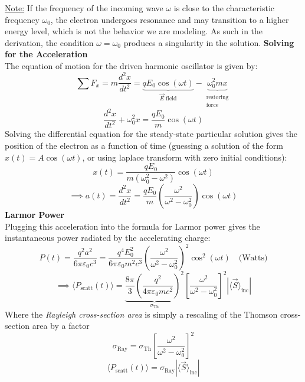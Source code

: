 \documentclass[12pt]{article}
\begin{document}
\noindent\underline{Note:} If the frequency of the incoming wave $\omega$ is close to the characteristic frequency $\omega_0$, the electron undergoes resonance and may transition to a higher energy level, which is not the behavior we are modeling. As such in the derivation, the condition $\omega = \omega_0$ produces a singularity in the solution.
\newpage\noindent
\textbf{Solving for the Acceleration}\\
The equation of motion for the driven harmonic oscillator is given by:
\[\sum F_x = m \frac{d^2 x}{dt^2} = \underbrace{q E_0 \cos(\omega t)}_{\text{$\vec{E}$ field}} - \underbrace{\omega_0^2mx}_{\substack{{\text{restoring}}\\\text{force}}}\]
\[\frac{d^2x}{dt^2}+\omega_0^2x = \frac{q E_0}{m}\cos(\omega t)\]
Solving the differential equation for the steady-state particular solution gives the position of the electron as a function of time (guessing a solution of the form $x(t) = A\cos(\omega t)$, or using laplace transform with zero initial conditions):
\[x(t) = \frac{q E_0}{m(\omega_0^2 - \omega^2)}\cos(\omega t)\]
\[\implies a(t) = \frac{d^2x}{dt^2} = \frac{qE_0}{m}\left(\frac{\omega^2}{\omega^2-\omega_0^2}\right)\cos(\omega t)\]
\textbf{Larmor Power}\\
Plugging this acceleration into the formula for Larmor power gives the instantaneous power radiated by the accelerating charge:
\[P(t) = \frac{q^2a^2}{6\pi\varepsilon_0c^3} = 
\frac{q^4E_0^2}{6\pi\varepsilon_0m^2c^3}\left(\frac{\omega^2}{\omega^2-\omega_0^2}\right)^2\cos^2(\omega t) \quad\text{(Watts)}\]
\[\implies
\langle P_{\text{scatt}}(t) \rangle
=
\underbrace{
\frac{8\pi}{3}
\left(
\frac{q^2}{4\pi \varepsilon_0 m c^2}
\right)^2}_{\sigma_{\text{Th}}}
\left[
\frac{\omega^2}{\omega^2 - \omega_0^2}
\right]^2
|\langle \vec{S} \rangle_{\text{inc}}|
\]
Where the \textit{Rayleigh cross-section area} is simply a rescaling of the Thomson cross-section area by a factor
\[
\sigma_{\text{Ray}}
=
\sigma_{\text{Th}}
\left[
\frac{\omega^2}{\omega^2 - \omega_0^2}
\right]^2
\]
\[\boxed{\langle P_{\text{scatt}}(t) \rangle = \sigma_{\text{Ray}} |\langle \vec{S} \rangle_{\text{inc}}|}\]

\end{document}
